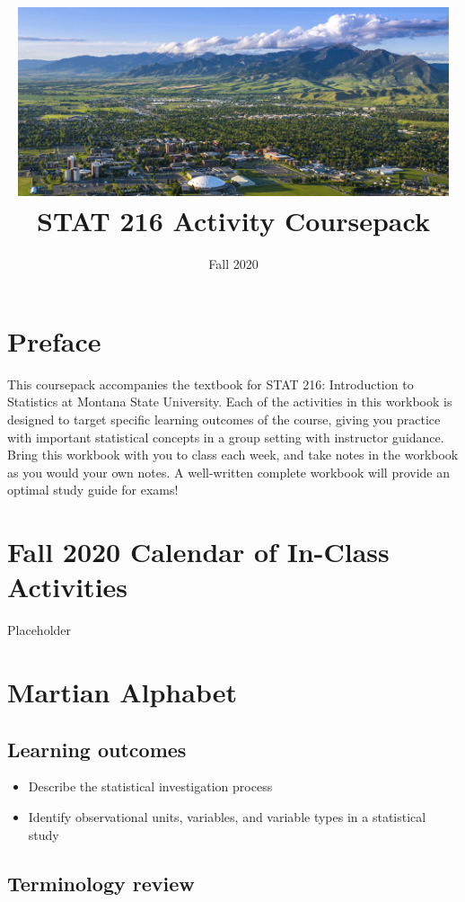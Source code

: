 \documentclass[
]{report}
\title{\includegraphics[width=5in,height=\textheight]{images/msu-campus.jpg}
\vspace{1cm}\\
STAT 216 Activity Coursepack}
\subtitle{Fall 2020}
\author{}
\date{\vspace{-2.5em}}
\begin{document}
\maketitle

{
\setcounter{tocdepth}{0}
\tableofcontents
}
\hypertarget{preface}{%
\chapter*{Preface}\label{preface}}

This coursepack accompanies the textbook for STAT 216: Introduction to Statistics at Montana State University. Each of the activities in this workbook is designed to target specific learning outcomes of the course, giving you practice with important statistical concepts in a group setting with instructor guidance. Bring this workbook with you to class each week, and take notes in the workbook as you would your own notes. A well-written complete workbook will provide an optimal study guide for exams!

\hypertarget{fall-2020-calendar-of-in-class-activities}{%
\chapter*{Fall 2020 Calendar of In-Class Activities}\label{fall-2020-calendar-of-in-class-activities}}

Placeholder

\hypertarget{martian-alphabet}{%
\chapter{Martian Alphabet}\label{martian-alphabet}}

\hypertarget{learning-outcomes}{%
\section{Learning outcomes}\label{learning-outcomes}}

\begin{itemize}
\item
  Describe the statistical investigation process
\item
  Identify observational units, variables, and variable types in a statistical study
\end{itemize}

\hypertarget{terminology-review}{%
\section{Terminology review}\label{terminology-review}}
\end{document}
